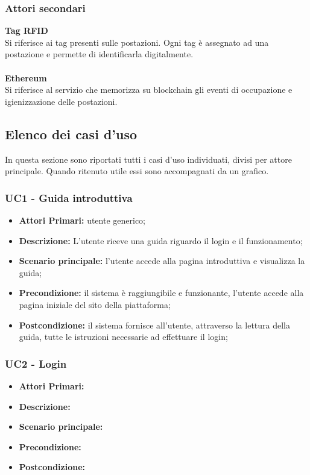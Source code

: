 \subsubsection{Attori secondari}
\textbf{Tag RFID}\\
Si riferisce ai tag presenti sulle postazioni. Ogni tag è assegnato ad una postazione e permette di identificarla digitalmente.\\
\\
\textbf{Ethereum}\\
Si riferisce al servizio che memorizza su blockchain gli eventi di occupazione e igienizzazione delle postazioni.\\

\subsection{Elenco dei casi d'uso}
In questa sezione sono riportati tutti i casi d'uso individuati, divisi per attore principale. Quando ritenuto utile essi sono accompagnati da un grafico.
\\
\subsubsection{ UC1 - Guida introduttiva}
\begin{itemize}
           	\item\textbf{Attori Primari:} utente generico;
           	\item\textbf{Descrizione:} L'utente riceve una guida riguardo il login e il funzionamento;
           	\item\textbf{Scenario principale:} l’utente accede alla pagina introduttiva e visualizza la guida;
           	\item\textbf{Precondizione:} il sistema è raggiungibile e funzionante, l’utente accede alla pagina iniziale del sito della piattaforma;
           	\item\textbf{Postcondizione:} il sistema fornisce all’utente, attraverso la lettura della guida, tutte le istruzioni necessarie ad effettuare il login;
\end{itemize}

\subsubsection{ UC2 - Login}
\begin{itemize}
           	\item\textbf{Attori Primari:} 
           	\item\textbf{Descrizione:} 
           	\item\textbf{Scenario principale:} 
           	\item\textbf{Precondizione:} 
           	\item\textbf{Postcondizione:}
\end{itemize}

